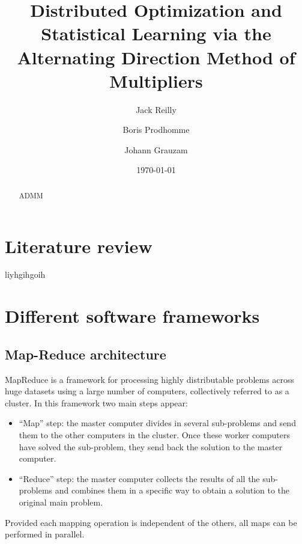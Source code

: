 \itshape\documentclass{article}
\begin{document}
\title{Distributed Optimization and Statistical Learning via the Alternating Direction Method of Multipliers}       
\author{Jack Reilly\and Boris Prodhomme\and Johann Grauzam\\ }       
\date{\today}         
\maketitle

\begin{abstract}

	ADMM \cite{ref1}
	
\end{abstract}

\section{Literature review}
 \label{Literature review}
 
	liyhgihgoih

\section{Different software frameworks}
 \label{Different software frameworks}
 
\subsection{Map-Reduce architecture}
	\label{Map-Reduce architecture} 
	
	MapReduce is a framework for processing highly distributable problems across huge datasets using a large number of computers, collectively referred to as a cluster. In this framework two main steps appear:

\begin{itemize}
\item ``Map'' step: the master computer divides in several sub-problems and send them to the other computers in the cluster. Once these worker computers have solved the sub-problem, they send back the solution to the master computer.

\item ``Reduce'' step: the master computer collects the results of all the sub-problems and combines them in a specific way to obtain a solution to the original main problem.

\end{itemize}

Provided each mapping operation is independent of the others, all maps can be performed in parallel. 	
\end{document}
